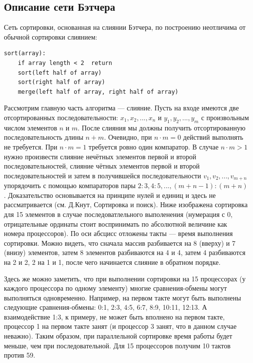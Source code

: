 \documentclass[14pt]{extarticle}
\begin{document}
\subsection{Описание сети Бэтчера}
Сеть сортировки, основанная на слиянии Бэтчера, по построению неотличима от обычной сортировки слиянием:
\begin{lstlisting}
sort(array):
	if array length < 2  return
	sort(left half of array)
	sort(right half of array)
	merge(left half of array, right half of array)
\end{lstlisting}

Рассмотрим главную часть алгоритма --- слияние.
Пусть на входе имеются две отсортированных последовательности: $x_1, x_2, ..., x_n$ и $y_1, y_2, ..., y_m$ с произвольным числом элементов $n$ и $m$. После слияния мы должны получить отсортированную последовательность длины $n+m$. Очевидно, при $n \cdot m = 0$ действий выполнять не требуется. При $n \cdot m = 1$ требуется ровно один компаратор. В случае $n \cdot m > 1$ нужно произвести слияние нечётных элементов первой и второй последовательностей, слияние чётных элементов первой и второй последовательностей и затем в получившейся последовательности $v_1, v_2, ..., v_{m+n}$ упорядочить с помощью компараторов пары $2:3, 4:5, ..., (m+n-1):(m+n)$. Доказательство основывается на принципе нулей и единиц и здесь не рассматривается (см. Д.Кнут, Сортировка и поиск). Ниже изображена сортировка для 15 элементов в случае последоватлельного выполенения (нумерация с 0, отрицательные ординаты стоит воспринимать по абсолютной величине как номера процессоров). По оси абсцисс отложены такты --- время выполнения сортировки. Можно видеть, что сначала массив разбивается на 8 (вверху) и 7 (внизу) элементов, затем 8 элементов разбиваются на 4 и 4, затем 4 разбиваются на 2 и 2, 2 на 1 и 1, после чего начинается слияние в обратном порядке.

Здесь же можно заметить, что при выполнении сортировки на 15 процессорах (у каждого процессора по одному элементу) многие сравнения-обмены могут выполняться одновременно. Например, на первом такте могут быть выполнены следующие сравнения-обмены: 0:1, 2:3, 4:5, 6:7, 8:9, 10:11, 12:13. А взаимодействие 1:3, к примеру, не может быть вполнено на первом такте, процессор 1 на первом такте занят (и процессор 3 занят, что в данном случае неважно). Таким образом, при параллельной сортировке время работы будет меньше, чем при последовательной. Для 15 процессоров получим 10 тактов против 59.
\end{document}

